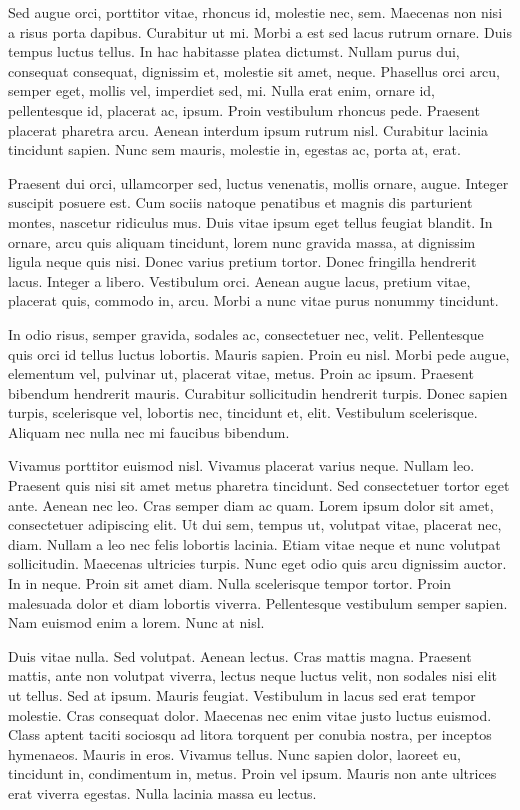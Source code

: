 \documentclass[printmode,mgr,pl]{mgr}
\begin{document}
Sed augue orci, porttitor vitae, rhoncus id, molestie nec,
sem. Maecenas non nisi a risus porta dapibus. Curabitur ut mi. Morbi a
est sed lacus rutrum ornare. Duis tempus luctus tellus. In hac
habitasse platea dictumst. Nullam purus dui, consequat consequat,
dignissim et, molestie sit amet, neque. Phasellus orci arcu, semper
eget, mollis vel, imperdiet sed, mi. Nulla erat enim, ornare id,
pellentesque id, placerat ac, ipsum. Proin vestibulum rhoncus
pede. Praesent placerat pharetra arcu. Aenean interdum ipsum rutrum
nisl. Curabitur lacinia tincidunt sapien. Nunc sem mauris, molestie
in, egestas ac, porta at, erat.

Praesent dui orci, ullamcorper sed, luctus venenatis, mollis ornare,
augue. Integer suscipit posuere est. Cum sociis natoque penatibus et
magnis dis parturient montes, nascetur ridiculus mus. Duis vitae ipsum
eget tellus feugiat blandit. In ornare, arcu quis aliquam tincidunt,
lorem nunc gravida massa, at dignissim ligula neque quis nisi. Donec
varius pretium tortor. Donec fringilla hendrerit lacus. Integer a
libero. Vestibulum orci. Aenean augue lacus, pretium vitae, placerat
quis, commodo in, arcu. Morbi a nunc vitae purus nonummy tincidunt.

In odio risus, semper gravida, sodales ac, consectetuer nec,
velit. Pellentesque quis orci id tellus luctus lobortis. Mauris
sapien. Proin eu nisl. Morbi pede augue, elementum vel, pulvinar ut,
placerat vitae, metus. Proin ac ipsum. Praesent bibendum hendrerit
mauris. Curabitur sollicitudin hendrerit turpis. Donec sapien turpis,
scelerisque vel, lobortis nec, tincidunt et, elit. Vestibulum
scelerisque. Aliquam nec nulla nec mi faucibus bibendum.

Vivamus porttitor euismod nisl. Vivamus placerat varius neque. Nullam
leo. Praesent quis nisi sit amet metus pharetra tincidunt. Sed
consectetuer tortor eget ante. Aenean nec leo. Cras semper diam ac
quam. Lorem ipsum dolor sit amet, consectetuer adipiscing elit. Ut dui
sem, tempus ut, volutpat vitae, placerat nec, diam. Nullam a leo nec
felis lobortis lacinia. Etiam vitae neque et nunc volutpat
sollicitudin. Maecenas ultricies turpis. Nunc eget odio quis arcu
dignissim auctor. In in neque. Proin sit amet diam. Nulla scelerisque
tempor tortor. Proin malesuada dolor et diam lobortis
viverra. Pellentesque vestibulum semper sapien. Nam euismod enim a
lorem. Nunc at nisl.

Duis vitae nulla. Sed volutpat. Aenean lectus. Cras mattis
magna. Praesent mattis, ante non volutpat viverra, lectus neque luctus
velit, non sodales nisi elit ut tellus. Sed at ipsum. Mauris
feugiat. Vestibulum in lacus sed erat tempor molestie. Cras consequat
dolor. Maecenas nec enim vitae justo luctus euismod. Class aptent
taciti sociosqu ad litora torquent per conubia nostra, per inceptos
hymenaeos. Mauris in eros. Vivamus tellus. Nunc sapien dolor, laoreet
eu, tincidunt in, condimentum in, metus. Proin vel ipsum. Mauris non
ante ultrices erat viverra egestas. Nulla lacinia massa eu lectus.
\end{document}
